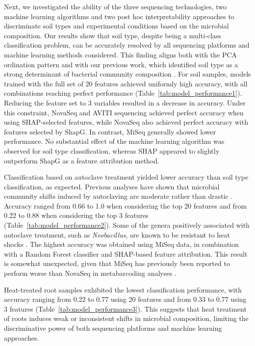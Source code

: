 \documentclass[12pt]{article}
\theoremstyle{thmstyleone}%
\theoremstyle{thmstyletwo}%
\theoremstyle{thmstylethree}%
\begin{document}
Next, we investigated the ability of the three sequencing technologies, two machine learning algorithms and two post hoc interpretability approaches to discriminate soil types and experimental conditions based on the microbial composition. Our results show that soil type, despite being a multi-class classification problem, can be accurately resolved by all sequencing platforms and machine learning methods considered. This finding aligns both with the PCA ordination pattern and with our previous work, which identified soil type as a strong determinant of bacterial community composition \citep{guazzini_variations_2026}.
For soil samples, models trained with the full set of 20 features achieved uniformly high accuracy, with all combinations reaching perfect performance (Table~\ref{tab:model_performance1}). Reducing the feature set to 3 variables resulted in a decrease in accuracy. Under this constraint, NovaSeq and AVITI sequencing achieved perfect accuracy when using SHAP-selected features, while NovaSeq also achieved perfect accuracy with features selected by ShapG. In contrast, MiSeq generally showed lower performance. No substantial effect of the machine learning algorithm was observed for soil type classification, whereas SHAP appeared to slightly outperform ShapG as a feature attribution method.

Classification based on autoclave treatment yielded lower accuracy than soil type classification, as expected. Previous analyses have shown that microbial community shifts induced by autoclaving are moderate rather than drastic \citep{guazzini_variations_2026}. Accuracy ranged from 0.66 to 1.0 when considering the top 20 features and from 0.22 to 0.88 when considering the top 3 features (Table~\ref{tab:model_performance2}). Some of the genera positively associated with autoclave treatment, such as \textit{Neobacillus}, are known to be resistant to heat shocks \citep{Hameed_24}. The highest accuracy was obtained using  MiSeq data, in combination with a Random Forest classifier and SHAP-based feature attribution. This result is somewhat unexpected, given that MiSeq has previously been reported to perform worse than NovaSeq in metabarcoding analyses \citep{Han2024}. 

Heat-treated root samples exhibited the lowest classification performance, with accuracy ranging from 0.22 to 0.77 using 20 features and from 0.33 to 0.77 using 3 features (Table~\ref{tab:model_performance3}). This suggests that heat treatment of roots induces weak or inconsistent shifts in microbial composition, limiting the discriminative power of both sequencing platforms and machine learning approaches.
\end{document}

